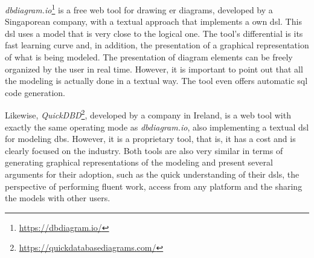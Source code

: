 \textit{dbdiagram.io}\footnote{\url{https://dbdiagram.io/}} is a free web tool for drawing \ac{er} diagrams, developed by a Singaporean company, with a textual approach that implements a own \ac{dsl}.
This \ac{dsl} uses a model that is very close to the logical one.
The tool's differential is its fast learning curve and, in addition, the presentation of a graphical representation of what is being modeled.
The presentation of diagram elements can be freely organized by the user in real time.
However, it is important to point out that all the modeling is actually done in a textual way.
The tool even offers automatic \ac{sql} code generation.

Likewise, \textit{QuickDBD}\footnote{\url{https://quickdatabasediagrams.com/}}, developed by a company in Ireland, is a web tool with exactly the same operating mode as \textit{dbdiagram.io}, also implementing a textual \ac{dsl} for modeling \acp{db}.
However, it is a proprietary tool, that is, it has a cost and is clearly focused on the industry.
Both tools are also very similar in terms of generating graphical representations of the modeling and present several arguments for their adoption, such as the quick understanding of their \acp{dsl}, the perspective of performing fluent work, access from any platform and the sharing the models with other users.

